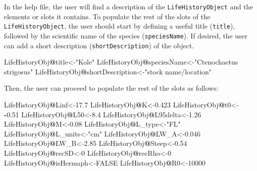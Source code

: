 \documentclass[
]{book}
\newenvironment{Shaded}{\begin{snugshade}}{\end{snugshade}}
\newcommand{\ConstantTok}[1]{\textcolor[rgb]{0.56,0.35,0.01}{#1}}
\newcommand{\DecValTok}[1]{\textcolor[rgb]{0.00,0.00,0.81}{#1}}
\newcommand{\FloatTok}[1]{\textcolor[rgb]{0.00,0.00,0.81}{#1}}
\newcommand{\NormalTok}[1]{#1}
\newcommand{\OtherTok}[1]{\textcolor[rgb]{0.56,0.35,0.01}{#1}}
\newcommand{\SpecialCharTok}[1]{\textcolor[rgb]{0.81,0.36,0.00}{\textbf{#1}}}
\newcommand{\StringTok}[1]{\textcolor[rgb]{0.31,0.60,0.02}{#1}}
\begin{document}
In the help file, the user will find a description of the \texttt{LifeHistoryObject} and the elements or slots it contains. To populate the rest of the slots of the \texttt{LifeHistoryObject}, the user should start by defining a useful title (\texttt{title}), followed by the scientific name of the species (\texttt{speciesName}). If desired, the user can add a short description (\texttt{shortDescription}) of the object.

\begin{Shaded}
\begin{Highlighting}[]
\NormalTok{LifeHistoryObj}\SpecialCharTok{@}\NormalTok{title}\OtherTok{\textless{}{-}}\StringTok{"Kole"}
\NormalTok{LifeHistoryObj}\SpecialCharTok{@}\NormalTok{speciesName}\OtherTok{\textless{}{-}}\StringTok{"Ctenochaetus strigosus"}
\NormalTok{LifeHistoryObj}\SpecialCharTok{@}\NormalTok{shortDescription}\OtherTok{\textless{}{-}}\StringTok{"stock name/location"}
\end{Highlighting}
\end{Shaded}

Then, the user can proceed to populate the rest of the slots as follows:

\begin{Shaded}
\begin{Highlighting}[]
\NormalTok{LifeHistoryObj}\SpecialCharTok{@}\NormalTok{Linf}\OtherTok{\textless{}{-}}\FloatTok{17.7}
\NormalTok{LifeHistoryObj}\SpecialCharTok{@}\NormalTok{K}\OtherTok{\textless{}{-}}\FloatTok{0.423}
\NormalTok{LifeHistoryObj}\SpecialCharTok{@}\NormalTok{t0}\OtherTok{\textless{}{-}} \SpecialCharTok{{-}}\FloatTok{0.51}
\NormalTok{LifeHistoryObj}\SpecialCharTok{@}\NormalTok{L50}\OtherTok{\textless{}{-}}\FloatTok{8.4}
\NormalTok{LifeHistoryObj}\SpecialCharTok{@}\NormalTok{L95delta}\OtherTok{\textless{}{-}}\FloatTok{1.26}
\NormalTok{LifeHistoryObj}\SpecialCharTok{@}\NormalTok{M}\OtherTok{\textless{}{-}}\FloatTok{0.08}
\NormalTok{LifeHistoryObj}\SpecialCharTok{@}\NormalTok{L\_type}\OtherTok{\textless{}{-}}\StringTok{"FL"}
\NormalTok{LifeHistoryObj}\SpecialCharTok{@}\NormalTok{L\_units}\OtherTok{\textless{}{-}}\StringTok{"cm"}
\NormalTok{LifeHistoryObj}\SpecialCharTok{@}\NormalTok{LW\_A}\OtherTok{\textless{}{-}}\FloatTok{0.046}
\NormalTok{LifeHistoryObj}\SpecialCharTok{@}\NormalTok{LW\_B}\OtherTok{\textless{}{-}}\FloatTok{2.85}
\NormalTok{LifeHistoryObj}\SpecialCharTok{@}\NormalTok{Steep}\OtherTok{\textless{}{-}}\FloatTok{0.54}
\NormalTok{LifeHistoryObj}\SpecialCharTok{@}\NormalTok{recSD}\OtherTok{\textless{}{-}}\DecValTok{0}
\NormalTok{LifeHistoryObj}\SpecialCharTok{@}\NormalTok{recRho}\OtherTok{\textless{}{-}}\DecValTok{0}
\NormalTok{LifeHistoryObj}\SpecialCharTok{@}\NormalTok{isHermaph}\OtherTok{\textless{}{-}}\ConstantTok{FALSE}
\NormalTok{LifeHistoryObj}\SpecialCharTok{@}\NormalTok{R0}\OtherTok{\textless{}{-}}\DecValTok{10000}
\end{Highlighting}
\end{Shaded}
\end{document}

